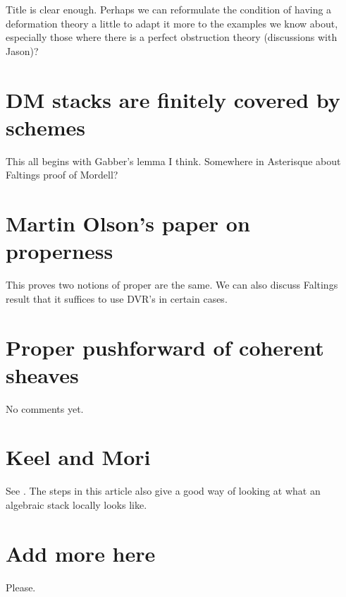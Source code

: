\noindent
Title is clear enough. Perhaps we can reformulate the condition of having a
deformation theory a little to adapt it more to the examples we know about,
especially those where there is a perfect obstruction theory (discussions
with Jason)?


\section{DM stacks are finitely covered by schemes}
\label{section-dm-finite-cover}

\noindent
This all begins with Gabber's lemma I think. Somewhere in Asterisque about
Faltings proof of Mordell?


\section{Martin Olson's paper on properness}
\label{section-proper-parametrization}

\noindent
This proves two notions of proper are the same. We can also discuss Faltings
result that it suffices to use DVR's in certain cases.


\section{Proper pushforward of coherent sheaves}
\label{section-proper-pushforward}

\noindent
No comments yet.


\section{Keel and Mori}
\label{section-keel-mori}

\noindent
See \cite{K-M}. The steps in this article also give a good way of looking at
what an algebraic stack locally looks like.


\section{Add more here}
\label{section-add-more}

\noindent
Please.









